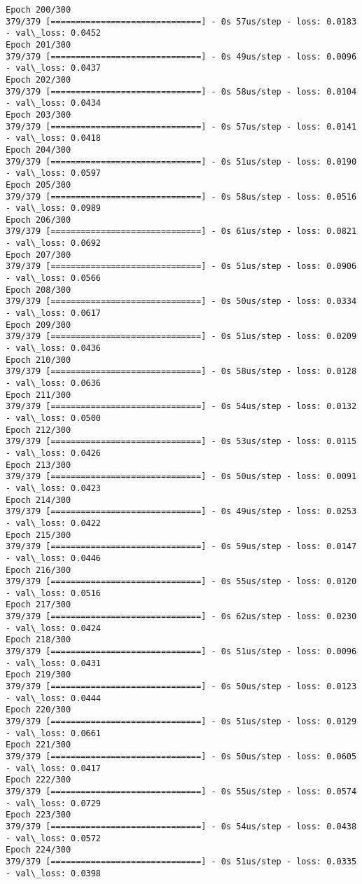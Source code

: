 \documentclass[11pt]{article}
\begin{document}
\begin{Verbatim}[commandchars=\\\{\}]
Epoch 200/300
379/379 [==============================] - 0s 57us/step - loss: 0.0183 - val\_loss: 0.0452
Epoch 201/300
379/379 [==============================] - 0s 49us/step - loss: 0.0096 - val\_loss: 0.0437
Epoch 202/300
379/379 [==============================] - 0s 58us/step - loss: 0.0104 - val\_loss: 0.0434
Epoch 203/300
379/379 [==============================] - 0s 57us/step - loss: 0.0141 - val\_loss: 0.0418
Epoch 204/300
379/379 [==============================] - 0s 51us/step - loss: 0.0190 - val\_loss: 0.0597
Epoch 205/300
379/379 [==============================] - 0s 58us/step - loss: 0.0516 - val\_loss: 0.0989
Epoch 206/300
379/379 [==============================] - 0s 61us/step - loss: 0.0821 - val\_loss: 0.0692
Epoch 207/300
379/379 [==============================] - 0s 51us/step - loss: 0.0906 - val\_loss: 0.0566
Epoch 208/300
379/379 [==============================] - 0s 50us/step - loss: 0.0334 - val\_loss: 0.0617
Epoch 209/300
379/379 [==============================] - 0s 51us/step - loss: 0.0209 - val\_loss: 0.0436
Epoch 210/300
379/379 [==============================] - 0s 58us/step - loss: 0.0128 - val\_loss: 0.0636
Epoch 211/300
379/379 [==============================] - 0s 54us/step - loss: 0.0132 - val\_loss: 0.0500
Epoch 212/300
379/379 [==============================] - 0s 53us/step - loss: 0.0115 - val\_loss: 0.0426
Epoch 213/300
379/379 [==============================] - 0s 50us/step - loss: 0.0091 - val\_loss: 0.0423
Epoch 214/300
379/379 [==============================] - 0s 49us/step - loss: 0.0253 - val\_loss: 0.0422
Epoch 215/300
379/379 [==============================] - 0s 59us/step - loss: 0.0147 - val\_loss: 0.0446
Epoch 216/300
379/379 [==============================] - 0s 55us/step - loss: 0.0120 - val\_loss: 0.0516
Epoch 217/300
379/379 [==============================] - 0s 62us/step - loss: 0.0230 - val\_loss: 0.0424
Epoch 218/300
379/379 [==============================] - 0s 51us/step - loss: 0.0096 - val\_loss: 0.0431
Epoch 219/300
379/379 [==============================] - 0s 50us/step - loss: 0.0123 - val\_loss: 0.0444
Epoch 220/300
379/379 [==============================] - 0s 51us/step - loss: 0.0129 - val\_loss: 0.0661
Epoch 221/300
379/379 [==============================] - 0s 50us/step - loss: 0.0605 - val\_loss: 0.0417
Epoch 222/300
379/379 [==============================] - 0s 55us/step - loss: 0.0574 - val\_loss: 0.0729
Epoch 223/300
379/379 [==============================] - 0s 54us/step - loss: 0.0438 - val\_loss: 0.0572
Epoch 224/300
379/379 [==============================] - 0s 51us/step - loss: 0.0335 - val\_loss: 0.0398

\end{Verbatim}
\end{document}
